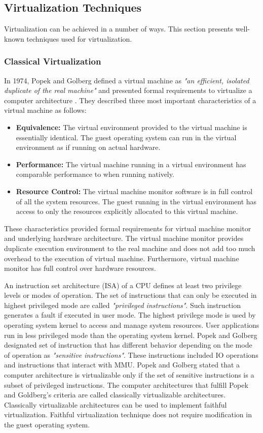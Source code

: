 \subsection{Virtualization Techniques}
Virtualization can be achieved in a number of ways. This section presents well-known techniques used for virtualization.

\subsubsection{Classical Virtualization}
In 1974, Popek and Golberg defined a virtual machine as \emph{"an efficient, isolated duplicate of the real machine"} and presented formal requirements to virtualize a computer architecture \cite{popek1974formal}. They described three most important characteristics of a virtual machine as follows:

\begin {itemize}
	\item {\textbf{Equivalence:}} The virtual environment provided to the virtual machine is essentially identical. The guest operating system can run in the virtual environment as if running on actual hardware.
	\item {\textbf{Performance:}} The virtual machine running in a virtual environment has comparable performance to when running natively.
	\item {\textbf{Resource Control:}} The virtual machine monitor software is in full control of all the system resources. The guest running in the virtual environment has access to only the resources explicitly allocated to this virtual machine.
\end {itemize}

These characteristics provided formal requirements for virtual machine monitor and underlying hardware architecture.
The virtual machine monitor provides duplicate execution environment to the real machine and does not add too much overhead to the execution of virtual machine.
Furthermore, virtual machine monitor has full control over hardware resources.

An instruction set architecture (ISA) of a CPU defines at least two privilege levels or modes of operation.
The set of instructions that can only be executed in highest privileged mode are called \emph{"privileged instructions"}.
Such instruction generates a fault if executed in user mode.
The highest privilege mode is used by operating system kernel to access and manage system resources.
User applications run in less privileged mode than the operating system kernel.
Popek and Golberg designated set of instruction that has different behavior depending on the mode of operation as \emph{"sensitive instructions"}.
These instructions included IO operations and instructions that interact with MMU.
Popek and Golberg stated that a computer architecture is virtualizable only if the set of sensitive instructions is a subset of privileged instructions. 
The computer architectures that fulfill Popek and Goldberg's criteria are called classically virtualizable architectures.
Classically virtualizable architectures can be used to implement faithful virtualization.
Faithful virtualization technique does not require modification in the guest operating system.

